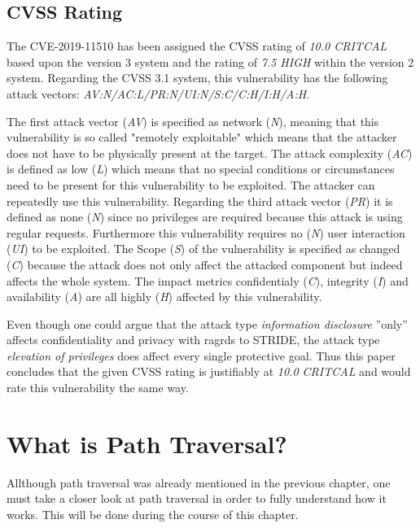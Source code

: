 \subsection{CVSS Rating}
\label{CVSS}
The CVE-2019-11510 has been assigned the CVSS rating of \textit{10.0 CRITCAL} based upon the version 3 system and the rating of \textit{7.5 HIGH} within the version 2 system. \autocite{NVDCVE:online} Regarding the CVSS 3.1 system, this vulnerability has the following attack vectors: \textit{AV:N/AC:L/PR:N/UI:N/S:C/C:H/I:H/A:H}. 

The first attack vector (\textit{AV}) is specified as network (\textit{N}), meaning that this vulnerability is so called "remotely exploitable" which means that the attacker does not have to be physically present at the target. The attack complexity (\textit{AC}) is defined as low (\textit{L}) which means that no special conditions or circumstances need to be present for this vulnerability to be exploited. The attacker can repeatedly use this vulnerability. Regarding the third attack vector (\textit{PR}) it is defined as none (\textit{N}) since no privileges are required because this attack is using regular requests. Furthermore this vulnerability requires no (\textit{N}) user interaction (\textit{UI}) to be exploited. The Scope (\textit{S}) of the vulnerability is specified as changed (\textit{C}) because the attack does not only affect the attacked component but indeed affects the whole system. The impact metrics confidentialy (\textit{C}), integrity (\textit{I}) and availability (\textit{A}) are all highly (\textit{H}) affected by this vulnerability.\autocite{NVDCVSSv30:online}

Even though one could argue that the attack type \textit{information disclosure} ''only'' affects confidentiality and privacy with ragrds to STRIDE, the attack type \textit{elevation of privileges} does affect every single protective goal. \autocite{Schneider-Folie-2} Thus this paper concludes that the given CVSS rating is justifiably at \textit{10.0 CRITCAL} and would rate this vulnerability the same way.

\section{What is Path Traversal?}
\label{path-traversal}
Allthough path traversal was already mentioned in the previous chapter, one must take a closer look at path traversal in order to fully understand how it works. This will be done during the course of this chapter.

